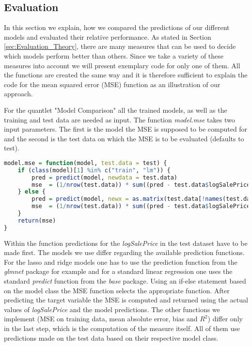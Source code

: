 \subsection{Evaluation}\label{sec:Evaluation_Implementation}
In this section we explain, how we compared the predictions of our different models and evaluated their relative performance. As stated in Section \ref{sec:Evaluation_Theory}, there are many measures that can be used to decide which models perform better than others. Since we take a variety of these measures into account we will present exemplary code for only one of them. All the functions are created the same way and it is therefore sufficient to explain the code for the mean squared error (MSE) function as an illustration of our approach.

For the quantlet "Model Comparison" all the trained models, as well as the training and test data are needed as input. The function \textit{model.mse} takes two input parameters. The first is the model the MSE is supposed to be computed for and the second is the test data on which the MSE is to be evaluated (defaults to test). 
\begin{lstlisting}[language=R]
model.mse = function(model, test.data = test) {
    if (class(model)[1] %in% c("train", "lm")) {
        pred = predict(model, newdata = test.data)
        mse  = (1/nrow(test.data)) * sum((pred - test.data$logSalePrice)^2)
    } else {
        pred = predict(model, newx = as.matrix(test.data[!names(test.data) %in% "logSalePrice"]), s = "lambda.1se")
        mse  = (1/nrow(test.data)) * sum((pred - test.data$logSalePrice)^2)
    }
    return(mse)
}
\end{lstlisting}
Within the function predictions for the \textit{logSalePrice} in the test dataset have to be made first. The models we use differ regarding the available prediction functions. For the lasso and ridge models one has to use the prediction function from the \textit{glmnet} package for example and for a standard linear regression one uses the standard \textit{predict} function from the \textit{base} package. Using an if-else statement based on the model class the MSE function selects the appropriate function. After predicting the target variable the MSE is computed and returned using the actual values of \textit{logSalePrice} and the model predictions. The other functions we implement (MSE on training data, mean absolute error, bias and $R^2$) differ only in the last step, which is the computation of the measure itself. All of them use predictions made on the test data based on their respective model class. 

